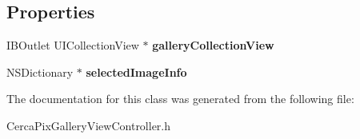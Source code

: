 \subsection*{Properties}
\begin{DoxyCompactItemize}
\item 
\hypertarget{interface_cerca_pix_gallery_view_controller_a5c8b7bf9ecdceed593fb331f8610785d}{I\-B\-Outlet U\-I\-Collection\-View $\ast$ {\bfseries gallery\-Collection\-View}}\label{interface_cerca_pix_gallery_view_controller_a5c8b7bf9ecdceed593fb331f8610785d}

\item 
\hypertarget{interface_cerca_pix_gallery_view_controller_a053754d01cb29ce5599c35aab789213c}{N\-S\-Dictionary $\ast$ {\bfseries selected\-Image\-Info}}\label{interface_cerca_pix_gallery_view_controller_a053754d01cb29ce5599c35aab789213c}

\end{DoxyCompactItemize}


The documentation for this class was generated from the following file\-:\begin{DoxyCompactItemize}
\item 
Cerca\-Pix\-Gallery\-View\-Controller.\-h\end{DoxyCompactItemize}
